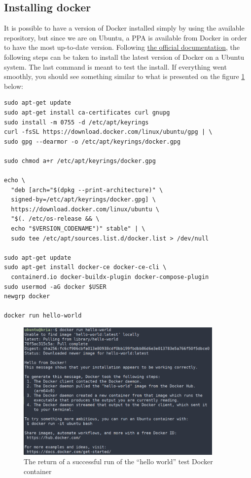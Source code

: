 \documentclass[10pt]{article}
\begin{document}
\subsection{Installing docker}
\label{sec:installing-docker}
It is possible to have a version of Docker installed simply by using the available repository, but since we are on Ubuntu, a PPA is available
from Docker in order to have the most up-to-date version.
Following \href{https://docs.docker.com/engine/install/ubuntu/#install-using-the-repository}{the official documentation}, the following steps can be taken to
install the latest version of Docker on a Ubuntu system.
The last command is meant to test the install. If everything went smoothly, you should see something similar to what is presented on the figure \ref{fig:hello-docker} below:
\begin{tcolorbox}
\begin{verbatim}
sudo apt-get update
sudo apt-get install ca-certificates curl gnupg
sudo install -m 0755 -d /etc/apt/keyrings
curl -fsSL https://download.docker.com/linux/ubuntu/gpg | \
sudo gpg --dearmor -o /etc/apt/keyrings/docker.gpg

sudo chmod a+r /etc/apt/keyrings/docker.gpg

echo \
  "deb [arch="$(dpkg --print-architecture)" \
  signed-by=/etc/apt/keyrings/docker.gpg] \
  https://download.docker.com/linux/ubuntu \
  "$(. /etc/os-release && \
  echo "$VERSION_CODENAME")" stable" | \
  sudo tee /etc/apt/sources.list.d/docker.list > /dev/null

sudo apt-get update
sudo apt-get install docker-ce docker-ce-cli \
  containerd.io docker-buildx-plugin docker-compose-plugin
sudo usermod -aG docker $USER
newgrp docker

docker run hello-world
\end{verbatim}
\end{tcolorbox}

\begin{figure}[H]
  \centering
  \includegraphics[width=0.9\textwidth]{./img/hello-docker.png}
  \caption{The return of a successful run of the ``hello world'' test Docker container}
  \label{fig:hello-docker}
\end{figure}
\end{document}
